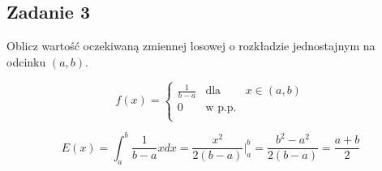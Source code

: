 \subsection{Zadanie 3}

Oblicz wartość oczekiwaną zmiennej losowej o rozkładzie jednostajnym na odcinku $(a,b)$.

$$
f(x) = \left\{
\begin{array}{rcl}
 \frac{1}{b - a} & \text{dla} & x \in (a,b)\\
 0 & \text{w p.p.} &\\
\end{array}
\right.
$$
  
$$
E(x) =  \int_{a}^{b} \frac{1}{b-a} x dx = \frac{x^2}{2(b-a)}\Bigg|^{b}_{a}  = \frac{b^2 - a^2}{2(b-a)} = \frac{a+b}{2}
$$
